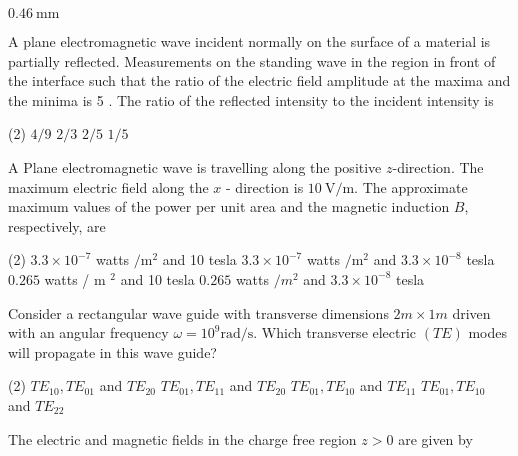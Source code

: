\begin{enumerate}
\begin{tasks}
	\task[\textbf{D.}]$0.46 \mathrm{~mm}$
\end{tasks}
\begin{minipage}{\textwidth}
	\item A plane electromagnetic wave incident normally on the surface of a material is partially reflected. Measurements on the standing wave in the region in front of the interface such that the ratio of the electric field amplitude at the maxima and the minima is 5 . The ratio of the reflected intensity to the incident intensity is
\end{minipage}
\begin{tasks}(2)
	\task[\textbf{A.}] $4 / 9$
	\task[\textbf{B.}] $2 / 3$
	\task[\textbf{C.}]$2 / 5$
	\task[\textbf{D.}]$1 / 5$
\end{tasks}
\begin{minipage}{\textwidth}
	\item A Plane electromagnetic wave is travelling along the positive $z$-direction. The maximum electric field along the $x$ - direction is $10 \mathrm{~V} / \mathrm{m}$. The approximate maximum values of the power per unit area and the magnetic induction $B$, respectively, are
\end{minipage}
\begin{tasks}(2)
	\task[\textbf{A.}] $3.3 \times 10^{-7}$ watts $/ \mathrm{m}^{2}$ and 10 tesla
	\task[\textbf{B.}]$3.3 \times 10^{-7}$ watts $/ \mathrm{m}^{2}$ and $3.3 \times 10^{-8}$ tesla
	\task[\textbf{C.}]$0.265$ watts / m $^{2}$ and 10 tesla
	\task[\textbf{D.}]$0.265$ watts $/ m^{2}$ and $3.3 \times 10^{-8}$ tesla	
\end{tasks}
\begin{minipage}{\textwidth}
	\item Consider a rectangular wave guide with transverse dimensions $2 m \times 1 m$ driven with an angular frequency $\omega=10^{9} \mathrm{rad} / \mathrm{s}$. Which transverse electric $(T E)$ modes will propagate in this wave guide?
\end{minipage}
\begin{tasks}(2)
	\task[\textbf{A.}] $T E_{10}, T E_{01}$ and $T E_{20}$
	\task[\textbf{B.}]$T E_{01}, T E_{11}$ and $T E_{20}$
	\task[\textbf{C.}]$T E_{01}, T E_{10}$ and $T E_{11}$
	\task[\textbf{D.}]$T E_{01}, T E_{10}$ and $T E_{22}$
\end{tasks}
\begin{minipage}{\textwidth}
	\item The electric and magnetic fields in the charge free region $z>0$ are given by

\end{minipage}
\end{enumerate}
